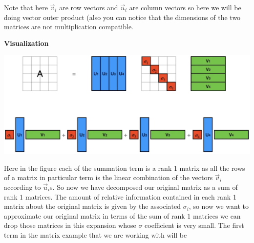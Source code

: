 \documentclass{article}
\begin{document}
Note that here $\vec{v}_{i}$ are row vectors and $\vec{u}_{i}$ are column vectors so here we will be doing vector outer product (also you can notice that the dimensions of the two matrices are not multiplication compatible.

\begin{center}
    \textbf{\large Visualization}
\end{center}

\includegraphics[width=16.5cm]{SVD_visualization.png}

Here in the figure each of the summation term is a rank 1 matrix as all the rows of a matrix in particular term is the linear combination of the vectors $\vec{v}_{i}$ according to $\vec{u}_{i}$s. So now we have decomposed our original matrix as a sum of rank 1 matrices. The amount of relative information contained in each rank 1 matrix about the original matrix is given by the associated $\sigma_{i}$, so now we want to approximate our original matrix in terms of the sum of rank 1 matrices we can drop those matrices in this expansion whose $\sigma$ coefficient is very small.
The first term in the matrix example that we are working with will be
\end{document}
